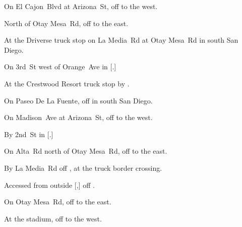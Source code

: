 
\begin{LocationList}

On El Cajon~Blvd at Arizona~St, off  to the west.

North of Otay Mesa~Rd, off  to the east.

At the Driverse truck stop on La Media~Rd at Otay Mesa~Rd in south San Diego.

On 3rd~St west of  Orange~Ave in [.]

At the Crestwood Resort truck stop by  .

On Paseo De La Fuente, off  in south San Diego.

\Location{\GarageHQ \Garage}
On Madison~Ave at Arizona~St, off  to the west.

By  2nd~St in [.]

On Alta~Rd north of Otay Mesa~Rd, off  to the east.

By La Media~Rd off , at the truck border crossing.

Accessed from  outside [,] off .

On Otay Mesa~Rd, off  to the east.

At the stadium, off  to the west.

\end{LocationList}
